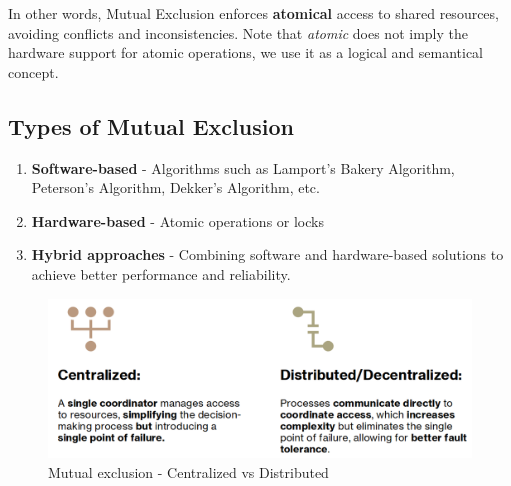 In other words, Mutual Exclusion enforces \textbf{atomical} access to shared resources, avoiding conflicts and inconsistencies.
Note that \textit{atomic} does not imply the hardware support for atomic operations, we use it as a logical and semantical concept.



\subsection{Types of Mutual Exclusion}
\begin{enumerate}
   \item \textbf{Software-based} - Algorithms such as Lamport's Bakery Algorithm, Peterson's Algorithm, Dekker's Algorithm, etc.
   \item \textbf{Hardware-based} - Atomic operations or locks
   \item \textbf{Hybrid approaches} - Combining software and hardware-based solutions to achieve better performance and reliability.
\end{enumerate}

\begin{figure}[htbp]
   \centering
   \includegraphics{images/04/mutual_types.png}
   \caption{Mutual exclusion - Centralized vs Distributed}
   \label{fig:04/mutual_types}
\end{figure}

